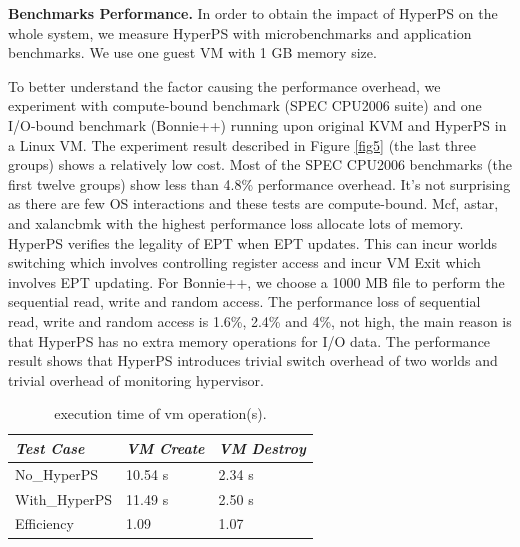 \documentclass[conference]{IEEEtran}
\begin{document}
\textbf{Benchmarks Performance.}
In order to obtain the impact of HyperPS on the whole system, we measure HyperPS with microbenchmarks and application benchmarks. 
We use one guest VM with 1 GB memory size. 

To better understand the factor causing the performance overhead, we experiment with compute-bound benchmark (SPEC CPU2006 suite) and one I/O-bound benchmark (Bonnie++) running upon original KVM and HyperPS in a Linux VM. The experiment result described in Figure \ref{fig5} (the last three groups) shows a relatively low cost. Most of the SPEC CPU2006 benchmarks (the first twelve groups) show less than 4.8\% performance overhead. It's not surprising as there are few OS interactions and these tests are compute-bound. Mcf, astar, and xalancbmk with the highest performance loss allocate lots of memory. HyperPS verifies the legality of EPT when EPT updates. This can incur worlds switching which involves controlling register access and incur VM Exit which involves EPT updating.
 For Bonnie++, we choose a 1000 MB file to perform the sequential read, write and random access. The performance loss of sequential read, write and random access is 1.6\%, 2.4\% and 4\%, not high, the main reason is that HyperPS has no extra memory operations for I/O data. The performance result shows that HyperPS introduces trivial switch overhead of two worlds and trivial overhead of monitoring hypervisor.

\begin{table}
\centering
\caption{execution time of vm operation(s).}\label{tabvm}
\begin{tabular}{p{2cm}|p{1.4cm}|p{1.5cm}}
\hline
{\itshape\bfseries  Test Case} & {\itshape\bfseries VM Create} & {\itshape\bfseries VM Destroy} \\
\hline
No\_HyperPS & 10.54 s &  2.34 s\\
\hline
With\_HyperPS & 11.49 s & 2.50 s\\ 
\hline
Efficiency & 1.09 & 1.07 \\
\hline
\end{tabular}
\end{table}
\end{document}
